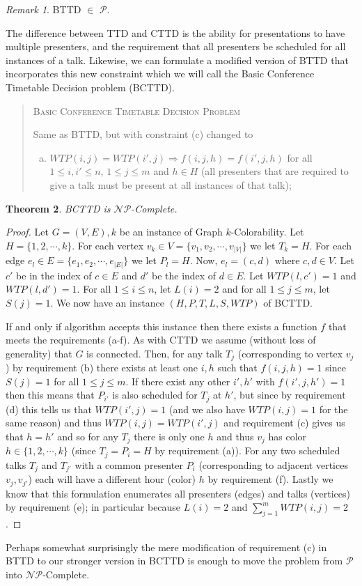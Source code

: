 \documentclass[]{article}
\newtheorem{thm}{Theorem}[section]
\theoremstyle{definition}
\theoremstyle{remark}
\newtheorem{rem}[thm]{Remark}
\numberwithin{equation}{section}
\newcommand{\cNP}{$\mathcal{NP}$}
\newcommand{\cP}{$\mathcal{P}$}
\begin{document}
\begin{rem}
	BTTD $\in$ \cP \cite{lovelace2010}.
\end{rem}
The difference between TTD and CTTD is the ability for presentations to have multiple presenters, and the requirement that all presenters be scheduled for all instances of a talk. Likewise, we can formulate a modified version of BTTD that incorporates this new constraint which we will call the Basic Conference Timetable Decision problem (BCTTD). 
\begin{quote}
	\textsc{Basic Conference Timetable Decision Problem}
	
	Same as BTTD, but with constraint (c) changed to
	\begin{enumerate}[(c)]
		\item $WTP(i,j) = WTP(i',j) \Rightarrow f(i,j,h)=f(i',j,h)$ for all $1 \le i,i' \le n$, $1 \le j \le m$ and $h \in H$ (all presenters that are required to give a talk must be present at all instances of that talk);
	\end{enumerate}
\end{quote}
\begin{thm}
	BCTTD is \cNP-Complete.
\end{thm}
\begin{proof}\label{bcttd_np}
	Let $G=(V,E),k$ be an instance of Graph $k$-Colorability. Let $H=\{1, 2, \cdots, k\}$. For each vertex $v_k \in V=\{v_1, v_2, \cdots, v_{|V|}\}$ we let $T_k = H$. For each edge $e_l \in E=\{e_1, e_2, \cdots, e_{|E|}\}$ we let $P_l = H$. Now, $e_l = (c,d)$ where $c,d \in V$. Let $c'$ be in the index of $c \in E$ and $d'$ be the index of $d \in E$. Let $WTP(l,c')=1$ and $WTP(l,d')=1$. For all $1 \le i \le n$, let $L(i)=2$ and for all $1 \le j \le m$, let $S(j)=1$. We now have an instance $(H,P,T,L,S,WTP)$ of BCTTD.
	
	If and only if algorithm accepts this instance then there exists a function $f$ that meets the requirements (a-f). As with CTTD we assume (without loss of generality) that $G$ is connected. Then, for any talk $T_j$ (corresponding to vertex $v_j$) by requirement (b) there exists at least one $i, h$ such that $f(i,j,h) = 1$ since $S(j)=1$ for all $1 \le j \le m$. If there exist any other $i',h'$ with $f(i',j,h')=1$ then this means that $P_{i'}$ is also scheduled for $T_j$ at $h'$, but since by requirement (d) this tells us that $WTP(i',j)=1$ (and we also have $WTP(i,j)=1$ for the same reason) and thus $WTP(i,j)=WTP(i',j)$ and requirement (c) gives us that $h=h'$ and so for any $T_j$ there is only one $h$ and thus $v_j$ has color $h \in \{1,2,\cdots,k\}$ (since $T_j=P_i=H$ by requirement (a)). For any two scheduled talks $T_j$ and $T_{j'}$ with a common presenter $P_i$ (corresponding to adjacent vertices $v_j, v_{j'}$) each will have a different hour (color) $h$ by requirement (f). Lastly we know that this formulation enumerates all presenters (edges) and talks (vertices) by requirement (e); in particular because $L(i) = 2$ and $\sum_{j=1}^{m} WTP(i,j) = 2$.
\end{proof}
Perhaps somewhat surprisingly the mere modification of requirement (c) in BTTD to our stronger version in BCTTD is enough to move the problem from \cP into \cNP-Complete. \\
\end{document}
